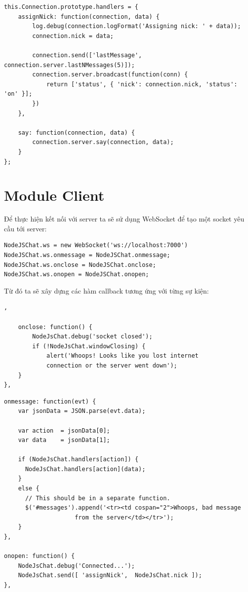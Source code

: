	\begin{verbatim}
this.Connection.prototype.handlers = {
	assignNick: function(connection, data) {
		log.debug(connection.logFormat('Assigning nick: ' + data));
		connection.nick = data;

		connection.send(['lastMessage', connection.server.lastNMessages(5)]);
		connection.server.broadcast(function(conn) {
			return ['status', { 'nick': connection.nick, 'status': 'on' }];
		})
	},

	say: function(connection, data) {
		connection.server.say(connection, data);
	}
};
	\end{verbatim}


\section{Module Client}
Để thực hiện kết nối với server ta sẽ sử dụng WebSocket để tạo một socket yêu cầu tới  server:
	\begin{verbatim}
NodeJSChat.ws = new WebSocket('ws://localhost:7000')
NodeJSChat.ws.onmessage = NodeJSChat.onmessage;
NodeJSChat.ws.onclose = NodeJSChat.onclose;
NodeJSChat.ws.onopen = NodeJSChat.onopen;
	\end{verbatim}

Từ đó ta sẽ xây dựng các hàm callback tương ứng với từng sự kiện:\\
	\begin{verbatim}
,

	onclose: function() {
		NodeJsChat.debug('socket closed');
		if (!NodeJsChat.windowClosing) {
			alert('Whoops! Looks like you lost internet
			connection or the server went down');
    }
},
	\end{verbatim}
	
	\begin{verbatim}
onmessage: function(evt) {
	var jsonData = JSON.parse(evt.data);

    var action  = jsonData[0];
    var data    = jsonData[1];

    if (NodeJsChat.handlers[action]) {
      NodeJsChat.handlers[action](data);
    }
    else {
      // This should be in a separate function.
      $('#messages').append('<tr><td cospan="2">Whoops, bad message
					from the server</td></tr>');
    }
},

onopen: function() {
    NodeJsChat.debug('Connected...');
    NodeJsChat.send([ 'assignNick',  NodeJsChat.nick ]);
},
	\end{verbatim}

